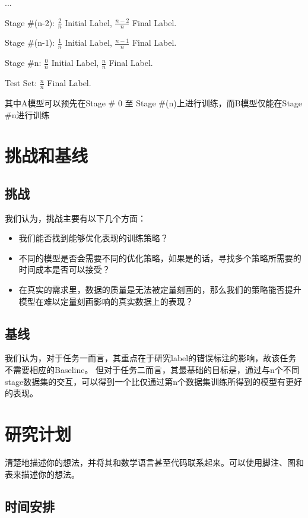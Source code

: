 \documentclass{article}
\begin{document}
...

Stage \#(n-2): $\frac{2}{n}$ Initial Label, $\frac{n-2}{n}$ Final Label.

Stage \#(n-1): $\frac{1}{n}$ Initial Label, $\frac{n-1}{n}$ Final Label.

Stage \#n: $\frac{0}{n}$ Initial Label, $\frac{n}{n}$ Final Label.

Test Set: $\frac{n}{n}$ Final Label.

其中A模型可以预先在Stage \# 0 至 Stage \#(n)上进行训练，而B模型仅能在Stage \#n进行训练

\section{挑战和基线}

\subsection{挑战}

我们认为，挑战主要有以下几个方面：

\begin{itemize}
    \item 我们能否找到能够优化表现的训练策略？
    \item 不同的模型是否会需要不同的优化策略，如果是的话，寻找多个策略所需要的时间成本是否可以接受？
    \item 在真实的需求里，数据的质量是无法被定量刻画的，那么我们的策略能否提升模型在难以定量刻画影响的真实数据上的表现？
\end{itemize}

\subsection{基线}

我们认为，对于任务一而言，其重点在于研究label的错误标注的影响，故该任务不需要相应的Baseline。
但对于任务二而言，其最基础的目标是，通过与n个不同stage数据集的交互，可以得到一个比仅通过第n个数据集训练所得到的模型有更好的表现。

\section{研究计划}


清楚地描述你的想法，并将其和数学语言甚至代码联系起来。可以使用脚注、图和表来描述你的想法。

\subsection{时间安排}
\end{document}
